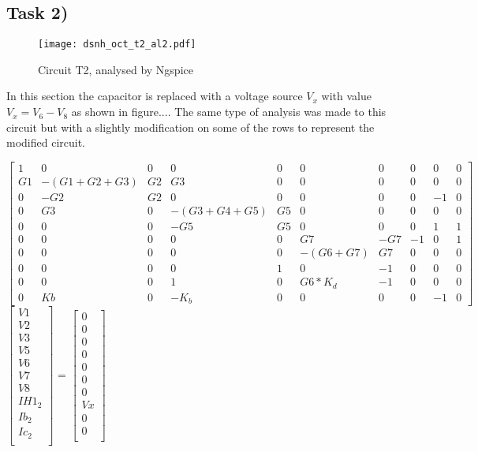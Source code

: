 \subsection{Task 2)}
\label{subsec:task2_a}

\begin{figure}[H]
	\centering
	\texttt{[image: dsnh\_oct\_t2\_al2.pdf]}
	\caption{Circuit T2, analysed by Ngspice}
\label{fig:Dsnh_sim_t2}
\end{figure}

In this section the capacitor is replaced with a voltage source $V_x$ with value $V_x = V_6 - V_8$ as shown in figure.... The same type of analysis was made to this circuit but with a slightly modification on some of the rows to represent the modified circuit.

{\footnotesize

$ \begin{bmatrix}
1 & 0 & 0 & 0 & 0 & 0 & 0 & 0 & 0 & 0 \\
G1 & -(G1+G2+G3) & G2 & G3 & 0 & 0 & 0 & 0 & 0 & 0 \\
0 & -G2 & G2 & 0 & 0 & 0 & 0 & 0 & -1 & 0 \\
0 & G3 & 0 & -(G3+G4+G5) & G5 & 0 & 0 & 0 & 0 & 0 \\
0 & 0 & 0 & -G5 & G5 & 0 & 0 & 0 & 1 & 1 \\
0 & 0 & 0 & 0 & 0 & G7 & -G7 & -1 & 0 & 1 \\
0 & 0 & 0 & 0 & 0 & -(G6+G7) & G7 & 0 & 0 & 0 \\
0 & 0 & 0 & 0 & 1 & 0 & -1 & 0 & 0 & 0 \\
0 & 0 & 0 & 1 & 0 & G6*K_d & -1 & 0 & 0 & 0 \\
0 & Kb & 0 & -K_b & 0 & 0 & 0 & 0 & -1 & 0 
\end{bmatrix}  $
$ \begin{bmatrix}
V1 \\
V2 \\
V3 \\
V5 \\
V6 \\
V7 \\
V8 \\
IH1_2 \\
Ib_2 \\
Ic_2 \\
\end{bmatrix}  $
=
$ \begin{bmatrix}
0 \\
0 \\
0 \\
0 \\
0 \\
0 \\
0 \\
Vx \\
0 \\
0 \\
\end{bmatrix}  $
}


